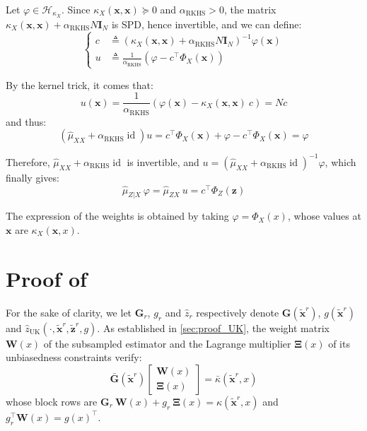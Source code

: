 Let $\varphi\in\mathcal{H}_{\kappa_X}$. Since $\kappa_X(\mathbf{x},\mathbf{x})\succeq0$ and $\alpha_{\mathrm{RKHS}}>0$, the matrix $\kappa_X(\mathbf{x},\mathbf{x})+\alpha_{\mathrm{RKHS}} N\mathbf{I}_N$ is SPD, hence invertible, and we can define:
\begin{equation}
	\left\{\begin{aligned}
	c&\triangleq\left(\kappa_X(\mathbf{x},\mathbf{x})+\alpha_{\mathrm{RKHS}} N\mathbf{I}_N\right)^{-1}\varphi(\mathbf{x})\\
	u&\triangleq\frac{1}{\alpha_{\mathrm{RKHS}}}\left(\varphi-c^\top\Phi_X(\mathbf{x})\right)
	\end{aligned}\right.
\end{equation}

By the kernel trick, it comes that:
\begin{equation}
	u(\mathbf{x})=\frac{1}{\alpha_{\mathrm{RKHS}}}\left(\varphi(\mathbf{x})-\kappa_X(\mathbf{x},\mathbf{x})\:c\right)=Nc
\end{equation}
and thus:
\begin{equation}
	\left(\hat{\mu}_{XX}+\alpha_{\mathrm{RKHS}} \operatorname{id}\right)u=c^\top\Phi_X(\mathbf{x})+\varphi-c^\top\Phi_X(\mathbf{x})=\varphi
\end{equation}

Therefore, $\hat{\mu}_{XX}+\alpha_{\mathrm{RKHS}} \operatorname{id}$ is invertible, and $u=\left(\hat{\mu}_{XX}+\alpha_{\mathrm{RKHS}} \operatorname{id}\right)^{-1}\varphi$, which finally gives:
\begin{equation}
	\hat{\mu}_{Z|X}\:\varphi=\hat{\mu}_{ZX}\:u=c^\top\Phi_Z(\mathbf{z})
\end{equation}

The expression of the weights is obtained by taking $\varphi=\Phi_X(x)$, whose values at $\mathbf{x}$ are $\kappa_X(\mathbf{x},x)$.

\section[Proof of Proposition 4.2]{Proof of }\label{sec:proof_residual_process}

For the sake of clarity, we let $\mathbf{G}_r$, $g_r$ and $\hat{z}_r$ respectively denote $\mathbf{G}(\tilde{\mathbf{x}}^r)$, $g(\tilde{\mathbf{x}}^r)$ and $\hat{z}_{\mathrm{UK}}(\cdot,\tilde{\mathbf{x}}^r,\tilde{\mathbf{z}}^r,g)$. As established in \cref{sec:proof_UK}, the weight matrix $\mathbf{W}(x)$ of the subsampled estimator and the Lagrange multiplier $\boldsymbol{\Xi}(x)$ of its unbiasedness constraints verify:
\begin{equation}
	\bar{\mathbf{G}}(\tilde{\mathbf{x}}^r)\begin{bmatrix}\mathbf{W}(x)\\\boldsymbol{\Xi}(x)\end{bmatrix}=\bar{\kappa}(\tilde{\mathbf{x}}^r,x)
\end{equation}
whose block rows are $\mathbf{G}_r\:\mathbf{W}(x)+g_r\:\boldsymbol{\Xi}(x)=\kappa(\tilde{\mathbf{x}}^r,x)$ and $g_r^\top \mathbf{W}(x)=g(x)^\top$.

